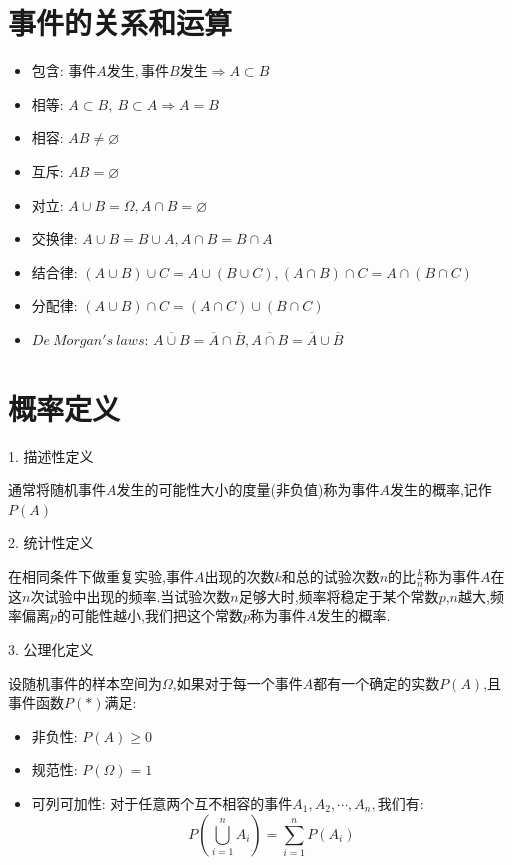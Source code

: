 \section{事件的关系和运算}
\begin{definition}[事件间关系]
	\begin{itemize}
		\item $\text{包含: }\text{事件}A\text{发生},\text{事件}B\text{发生}\Rightarrow A\subset B$
		\item $\text{相等: }A\subset B,\ B\subset A\Rightarrow A=B$
		\item $\text{相容: }AB\neq \varnothing$
		\item $\text{互斥: }AB=\varnothing$
		\item $\text{对立: }A\cup B=\Omega, A\cap B=\varnothing$
	\end{itemize}
\end{definition}
\begin{definition}[运算法则]
	\begin{itemize}
		\item $\text{交换律: } A\cup B=B\cup A, A\cap B=B\cap A$
		\item $\text{结合律: }(A\cup B)\cup C=A\cup (B\cup C), (A\cap B)\cap C=A\cap (B\cap C)$
		\item $\text{分配律: }(A\cup B)\cap C=(A\cap C)\cup (B\cap C)$
		\item $De\ Morgan's\ laws\text{: }\overline{A\cup B}=\overline{A}\cap\overline{B}, \overline{A\cap B}=\overline{A}\cup\overline{B} $
	\end{itemize}
\end{definition}
\section{概率定义}
\begin{definition}[概率定义]
	1. 描述性定义
	
	通常将随机事件$A$发生的可能性大小的度量(非负值)称为事件$A$发生的概率,记作$P(A)$
	
	2. 统计性定义
	
	在相同条件下做重复实验,事件$A$出现的次数$k$和总的试验次数$n$的比$\frac{k}{n}$称为事件$A$在这$n$次试验中出现的频率.当试验次数$n$足够大时,频率将稳定于某个常数$p$,$n$越大,频率偏离$p$的可能性越小,我们把这个常数$p$称为事件$A$发生的概率.
	
	3. 公理化定义
	
	设随机事件的样本空间为$\Omega$,如果对于每一个事件$A$都有一个确定的实数$P(A)$,且事件函数$P(*)$满足: 
	\begin{itemize}
		\item $\text{非负性: }P(A)\geq 0$
		\item $\text{规范性: }P(\Omega)=1$
		\item $\text{可列可加性: }\text{对于任意两个互不相容的事件}A_{1},A_{2},\cdots,A_{n},\text{我们有: }$
		$$P(\bigcup_{i=1}^{n}A_{i})=\sum\limits_{i=1}^{n}P(A_{i})$$
	\end{itemize}
\end{definition}
